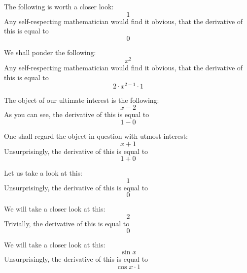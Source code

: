 \documentclass{article}
\begin{document}
The following is worth a closer look:
\begin{equation}
1 
\end{equation}
Any self-respecting mathematician would find it obvious, that the derivative of this is equal to
\begin{equation}
0 
\end{equation}

We shall ponder the following:
\begin{equation}
x ^{2 } 
\end{equation}
Any self-respecting mathematician would find it obvious, that the derivative of this is equal to
\begin{equation}
2 \cdot x ^{2 - 1 } \cdot 1 
\end{equation}

The object of our ultimate interest is the following:
\begin{equation}
x - 2 
\end{equation}
As you can see, the derivative of this is equal to
\begin{equation}
1 - 0 
\end{equation}

One shall regard the object in question with utmost interest:
\begin{equation}
x + 1 
\end{equation}
Unsurprisingly, the derivative of this is equal to
\begin{equation}
1 + 0 
\end{equation}

Let us take a look at this:
\begin{equation}
1 
\end{equation}
Unsurprisingly, the derivative of this is equal to
\begin{equation}
0 
\end{equation}

We will take a closer look at this:
\begin{equation}
2 
\end{equation}
Trivially, the derivative of this is equal to
\begin{equation}
0 
\end{equation}

We will take a closer look at this:
\begin{equation}
\sin x 
\end{equation}
Unsurprisingly, the derivative of this is equal to
\begin{equation}
\cos x \cdot 1 
\end{equation}
\end{document}
